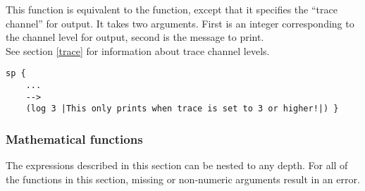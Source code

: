 \begin{description}

\item [\soarb{log} --- ] This function is equivalent to the  function,
except that it specifies the ``trace channel'' for output. It takes two arguments. First is an integer
corresponding to the channel level for output, second is the message to print. \\
See section \ref{trace} for information about trace channel levels.
\begin{verbatim}
sp {
	...
	-->
	(log 3 |This only prints when trace is set to 3 or higher!|) }
\end{verbatim}


\end{description}

\subsubsection{Mathematical functions}

The expressions described in this section can be nested to any depth. For all
of the functions in this section, missing or non-numeric arguments result 
in an error.


